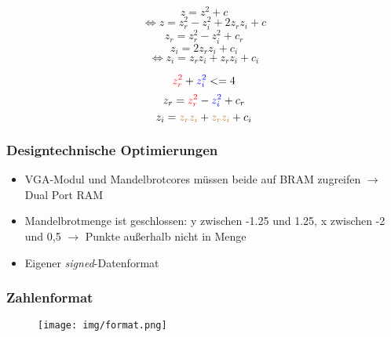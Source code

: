 \documentclass{beamer}
\begin{document}
\begin{frame}
    \[z = z^2 + c\]
    \[\Leftrightarrow z = z_r^2 - z_i^2 + 2 z_r z_i + c\]
    \[z_r = z_r^2 - z_i^2 + c_r\]
    \[z_i = 2  z_r  z_i + c_i\]
    \[\Leftrightarrow z_i = z_r z_i + z_r z_i + c_i\]
\end{frame}

\begin{frame}
    \[\color{red} z_r^2 \color{black} + \color{blue} z_i^2 \color{black} <= 4\]
    \[z_r = \color{red} z_r^2 \color{black} - \color{blue} z_i^2 \color{black} + c_r\]
    \[z_i = \color{brown} z_r z_i \color{black} + \color{brown} z_r z_i \color{black} + c_i\]
\end{frame}

\begin{frame}
    \frametitle{Designtechnische Optimierungen}
    \begin{itemize}
        \item VGA-Modul und Mandelbrotcores müssen beide auf BRAM zugreifen $\rightarrow$ Dual Port RAM
        \item Mandelbrotmenge ist geschlossen: y zwischen -1.25 und 1.25, x zwischen -2 und 0,5 $\rightarrow$ 
        Punkte außerhalb nicht in Menge
        \item Eigener \textit{signed}-Datenformat
    \end{itemize}
\end{frame}

\begin{frame}
    \frametitle{Zahlenformat}
    \begin{figure}
        \texttt{[image: img/format.png]}
    \end{figure}
\end{frame}

{
    \begin{frame}[plain]
    \end{frame}
    }
\end{document}
